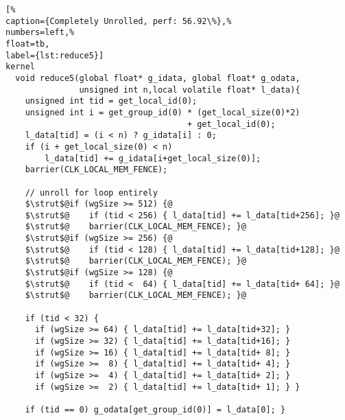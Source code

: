 \begin{lstlisting}[%                                                             
caption={Completely Unrolled, perf: 56.92\%},%
numbers=left,%
float=tb,
label={lst:reduce5}]
kernel
  void reduce5(global float* g_idata, global float* g_odata,
               unsigned int n,local volatile float* l_data){
    unsigned int tid = get_local_id(0);
    unsigned int i = get_group_id(0) * (get_local_size(0)*2)
                                     + get_local_id(0);
    l_data[tid] = (i < n) ? g_idata[i] : 0;
    if (i + get_local_size(0) < n) 
        l_data[tid] += g_idata[i+get_local_size(0)];  
    barrier(CLK_LOCAL_MEM_FENCE);

    // unroll for loop entirely
    $\strut$@if (wgSize >= 512) {@
    $\strut$@    if (tid < 256) { l_data[tid] += l_data[tid+256]; }@
    $\strut$@    barrier(CLK_LOCAL_MEM_FENCE); }@
    $\strut$@if (wgSize >= 256) {@
    $\strut$@    if (tid < 128) { l_data[tid] += l_data[tid+128]; }@
    $\strut$@    barrier(CLK_LOCAL_MEM_FENCE); }@
    $\strut$@if (wgSize >= 128) {@
    $\strut$@    if (tid <  64) { l_data[tid] += l_data[tid+ 64]; }@
    $\strut$@    barrier(CLK_LOCAL_MEM_FENCE); }@
    
    if (tid < 32) {
      if (wgSize >= 64) { l_data[tid] += l_data[tid+32]; }
      if (wgSize >= 32) { l_data[tid] += l_data[tid+16]; }
      if (wgSize >= 16) { l_data[tid] += l_data[tid+ 8]; }
      if (wgSize >=  8) { l_data[tid] += l_data[tid+ 4]; }
      if (wgSize >=  4) { l_data[tid] += l_data[tid+ 2]; }
      if (wgSize >=  2) { l_data[tid] += l_data[tid+ 1]; } }
    
    if (tid == 0) g_odata[get_group_id(0)] = l_data[0]; }
\end{lstlisting}

